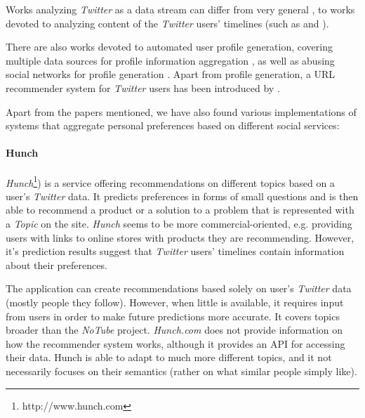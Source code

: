 Works analyzing \textit{Twitter} as a data stream can differ from very general \cite{why-we-twitter},
to works devoted to analyzing content of the \textit{Twitter} users' timelines (such as \cite{twitter-content-is-it} and \cite{short-tweet}).

There are also works devoted to automated user profile generation, covering multiple data sources for profile
information aggregation \cite{public-profiles}, as well as abusing social networks for profile generation \cite{twitter-abuse}. Apart from profile generation, a URL recommender system for \textit{Twitter} users
has been introduced by \cite{short-tweet}.

Apart from the papers mentioned, we have also found various implementations of systems that aggregate personal preferences based on different
social services:

\paragraph{Hunch}
\textit{Hunch}\footnote{http://www.hunch.com}) is a service offering recommendations on different topics based on a user's \textit{Twitter} data. It predicts preferences in forms of small questions and is then able to recommend a product or a solution to a problem that is represented with a \textit{Topic} on the site. \textit{Hunch} seems to be more commercial-oriented, e.g. providing users with links to online stores with products they are recommending. However,
it's prediction results suggest that \textit{Twitter} users' timelines contain information about their preferences.

The application can create recommendations based solely on user's \textit{Twitter} data (mostly people they follow). However, when little is available, it requires input from users in order to make future predictions more accurate. It covers topics broader than the \textit{NoTube} project.
\textit{Hunch.com} does not provide information on how the recommender system works, although it provides an API for accessing their data.
Hunch is able to adapt to much more different topics, and it not necessarily focuses on their semantics (rather on what similar people simply like).